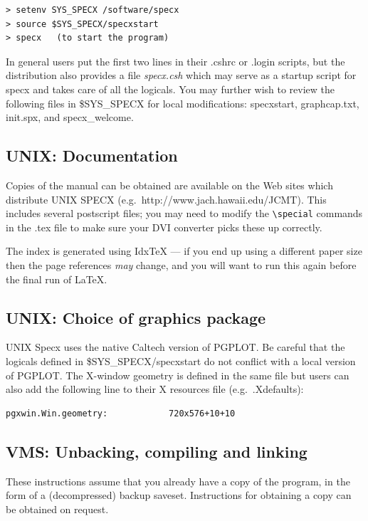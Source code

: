 \documentclass[11pt,twoside]{report}
\begin{document}
\begin{verbatim}
> setenv SYS_SPECX /software/specx
> source $SYS_SPECX/specxstart
> specx   (to start the program)
\end{verbatim}

In general users put the first two lines in their .cshrc or .login
scripts, but the distribution also provides a file {\em specx.csh}
which may serve as a startup script for specx and takes care of all
the logicals. You may further wish to review the following files in
\$SYS\_SPECX for local modifications: specxstart, graphcap.txt, init.spx,
and specx\_welcome.

\subsection{UNIX: Documentation}

Copies of the manual can be obtained are available on the
Web sites which distribute UNIX SPECX (e.g.\ http://www.jach.hawaii.edu/JCMT).
This includes several postscript files; you may need to modify the
\verb+\special+ commands in the .tex file to make sure your DVI
converter picks these up correctly.

The index is generated using Idx{\TeX} --- if you end up using a
different paper size then the page references {\em may} change, and
you will want to run this again before the final run of \LaTeX.


\subsection{UNIX: Choice of graphics package}

UNIX Specx uses the native Caltech version of PGPLOT. Be careful that
the logicals defined in \$SYS\_SPECX/specxstart do not conflict with
a local version of PGPLOT. The X-window geometry is defined in
the same file but users can also add the following line to their X
resources file (e.g.\ .Xdefaults):
\begin{verbatim}
pgxwin.Win.geometry:            720x576+10+10
\end{verbatim}

\subsection{VMS: Unbacking, compiling and linking}

These instructions assume that you already have a copy of the program, in the
form of a (decompressed) backup saveset. Instructions for obtaining a copy
can be obtained on request.
\end{document}
